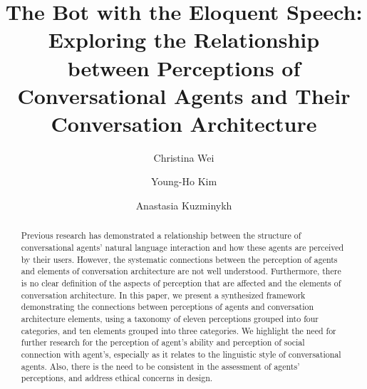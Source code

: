 \documentclass[sigconf,screen,review, anonymous]{acmart}
\begin{document}

\title[The Bot with the Eloquent Speech]{The Bot with the Eloquent Speech: Exploring the Relationship between Perceptions of Conversational Agents and Their Conversation Architecture}

\author{Christina Wei}

\author{Young-Ho Kim}

\author{Anastasia Kuzminykh}

\renewcommand{\shortauthors}{Wei, Kim, and Kuzminykh}

\begin{abstract}
Previous research has demonstrated a relationship between the structure of conversational agents' natural language interaction and how these agents are perceived by their users. However, the systematic connections between the perception of agents and elements of conversation architecture are not well understood. Furthermore, there is no clear definition of the aspects of perception that are affected and the elements of conversation architecture. In this paper, we present a synthesized framework demonstrating the connections between perceptions of agents and conversation architecture elements, using a taxonomy of eleven perceptions grouped into four categories, and ten elements grouped into three categories. We highlight the need for further research for the perception of agent's ability and perception of social connection with agent's, especially as it relates to the linguistic style of conversational agents.  Also, there is the need to be consistent in the assessment of agents' perceptions, and address ethical concerns in design.
\end{abstract}
\end{document}
